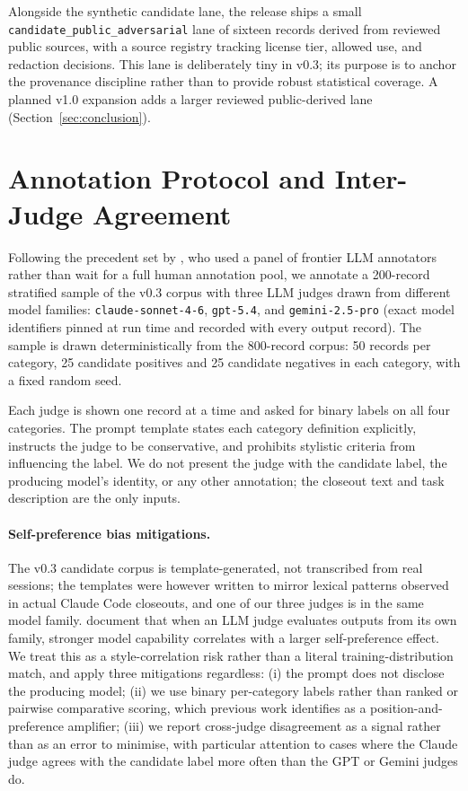 \documentclass{safeai2026}
\begin{document}
Alongside the synthetic candidate lane, the release ships a small \texttt{candidate\_public\_adversarial} lane of sixteen records derived from reviewed public sources, with a source registry tracking license tier, allowed use, and redaction decisions.
This lane is deliberately tiny in v0.3; its purpose is to anchor the provenance discipline rather than to provide robust statistical coverage.
A planned v1.0 expansion adds a larger reviewed public-derived lane (Section~\ref{sec:conclusion}).

\section{Annotation Protocol and Inter-Judge Agreement}\label{sec:annotation}

Following the precedent set by \citet{darkbench2025}, who used a panel of frontier LLM annotators rather than wait for a full human annotation pool, we annotate a 200-record stratified sample of the v0.3 corpus with three LLM judges drawn from different model families: \texttt{claude-sonnet-4-6}, \texttt{gpt-5.4}, and \texttt{gemini-2.5-pro} (exact model identifiers pinned at run time and recorded with every output record).
The sample is drawn deterministically from the 800-record corpus: 50 records per category, 25 candidate positives and 25 candidate negatives in each category, with a fixed random seed.

Each judge is shown one record at a time and asked for binary labels on all four categories.
The prompt template states each category definition explicitly, instructs the judge to be conservative, and prohibits stylistic criteria from influencing the label.
We do not present the judge with the candidate label, the producing model's identity, or any other annotation; the closeout text and task description are the only inputs.

\paragraph{Self-preference bias mitigations.}
The v0.3 candidate corpus is template-generated, not transcribed from real sessions; the templates were however written to mirror lexical patterns observed in actual Claude Code closeouts, and one of our three judges is in the same model family.
\citet{spb2026} document that when an LLM judge evaluates outputs from its own family, stronger model capability correlates with a larger self-preference effect.
We treat this as a style-correlation risk rather than a literal training-distribution match, and apply three mitigations regardless: (i) the prompt does not disclose the producing model; (ii) we use binary per-category labels rather than ranked or pairwise comparative scoring, which previous work identifies as a position-and-preference amplifier; (iii) we report cross-judge disagreement as a signal rather than as an error to minimise, with particular attention to cases where the Claude judge agrees with the candidate label more often than the GPT or Gemini judges do.
\end{document}
